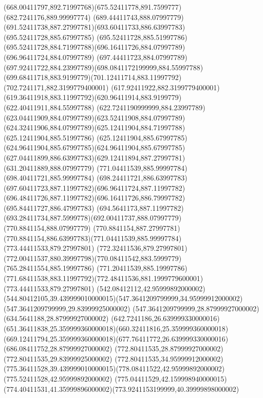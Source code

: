 {{	\curveto(668.00411797,892.71997768)(675.52411778,891.7599777)(682.7241176,889.99997774)
	\closepath
	\moveto(689.44411743,888.07997779)
	\curveto(691.52411738,887.27997781)(693.60411733,886.63997783)(695.52411728,885.67997785)
	\lineto(695.52411728,885.51997786)
	\curveto(695.52411728,884.71997788)(696.16411726,884.07997789)(696.96411724,884.07997789)
	\curveto(697.44411723,884.07997789)(697.92411722,884.23997789)(698.0841172199999,884.55997788)
	\curveto(699.68411718,883.9199779)(701.12411714,883.11997792)(702.7241171,882.3199779400001)
	\lineto(617.92411922,882.3199779400001)
	\curveto(619.36411918,883.11997792)(620.96411914,883.9199779)(622.40411911,884.55997788)
	\curveto(622.7241190999999,884.23997789)(623.04411909,884.07997789)(623.52411908,884.07997789)
	\curveto(624.32411906,884.07997789)(625.12411904,884.71997788)(625.12411904,885.51997786)
	\curveto(625.12411904,885.67997785)(624.96411904,885.67997785)(624.96411904,885.67997785)
	\curveto(627.04411899,886.63997783)(629.12411894,887.27997781)(631.20411889,888.07997779)
	\closepath
	\moveto(771.04411539,885.99997784)
	\lineto(698.40411721,885.99997784)
	\curveto(698.24411721,886.63997783)(697.60411723,887.11997782)(696.96411724,887.11997782)
	\curveto(696.48411726,887.11997782)(696.16411726,886.79997782)(695.84411727,886.47997783)
	\curveto(694.5641173,887.11997782)(693.28411734,887.5999778)(692.00411737,888.07997779)
	\lineto(770.8841154,888.07997779)
	\curveto(770.8841154,887.27997781)(770.8841154,886.63997783)(771.04411539,885.99997784)
	\closepath
	\moveto(773.44411533,879.27997801)
	\lineto(772.32411536,879.27997801)
	\curveto(772.00411537,880.39997798)(770.08411542,883.5999779)(765.28411554,885.19997786)
	\lineto(771.20411539,885.19997786)
	\curveto(771.68411538,883.11997792)(772.48411536,881.1999779600001)(773.44411533,879.27997801)
	\closepath
	\moveto(542.08412112,42.95999892000002)
	\curveto(544.80412105,39.439999010000015)(547.3641209799999,34.95999912000002)(547.3641209799999,29.83999925000002)
	\lineto(547.3641209799999,28.87999927000002)
	\lineto(634.5641188,28.87999927000002)
	\curveto(642.7241186,26.639999330000016)(651.36411838,25.359999360000018)(660.32411816,25.359999360000018)
	\curveto(669.12411794,25.359999360000018)(677.76411772,26.639999330000016)(686.08411752,28.87999927000002)
	\lineto(772.80411535,28.87999927000002)
	\lineto(772.80411535,29.83999925000002)
	\curveto(772.80411535,34.95999912000002)(775.36411528,39.439999010000015)(778.08411522,42.95999892000002)
	\lineto(775.52411528,42.95999892000002)
	\curveto(775.04411529,42.159998940000015)(774.40411531,41.35999896000002)(773.9241153199999,40.39999898000002)
}}
